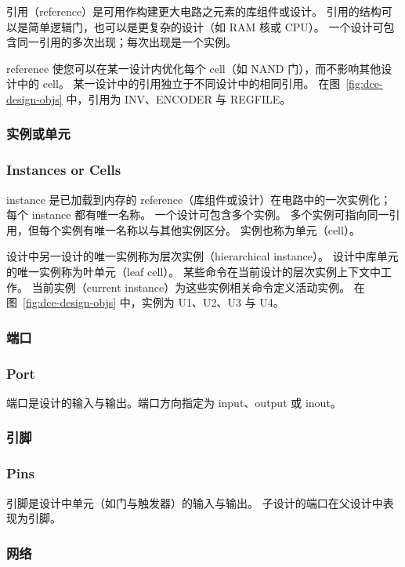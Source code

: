 引用（reference）是可用作构建更大电路之元素的库组件或设计。
引用的结构可以是简单逻辑门，也可以是更复杂的设计（如 RAM 核或 CPU）。
一个设计可包含同一引用的多次出现；每次出现是一个实例。

reference 使您可以在某一设计内优化每个 cell（如 NAND 门），而不影响其他设计中的 cell。
某一设计中的引用独立于不同设计中的相同引用。
在图~\ref{fig:dce-design-objs} 中，引用为 INV、ENCODER 与 REGFILE。

\subsubsection{实例或单元}
\subsubsection*{Instances or Cells}

instance 是已加载到内存的 reference（库组件或设计）在电路中的一次实例化；每个 instance 都有唯一名称。
一个设计可包含多个实例。
多个实例可指向同一引用，但每个实例有唯一名称以与其他实例区分。
实例也称为单元（cell）。

设计中另一设计的唯一实例称为层次实例（hierarchical instance）。
设计中库单元的唯一实例称为叶单元（leaf cell）。
某些命令在当前设计的层次实例上下文中工作。
当前实例（current instance）为这些实例相关命令定义活动实例。
在图~\ref{fig:dce-design-objs} 中，实例为 U1、U2、U3 与 U4。

\subsubsection{端口}
\subsubsection*{Port}

端口是设计的输入与输出。端口方向指定为 input、output 或 inout。

\subsubsection{引脚}
\subsubsection*{Pins}

引脚是设计中单元（如门与触发器）的输入与输出。
子设计的端口在父设计中表现为引脚。

\subsubsection{网络}
